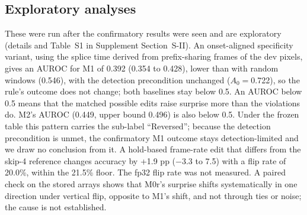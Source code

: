 \subsection{Exploratory analyses}
\label{sec:res-expl}
These were run after the confirmatory results were seen and are exploratory (details and Table~S1 in Supplement Section~S-II). An onset-aligned specificity variant, using the splice time derived from prefix-sharing frames of the dev pixels, gives an AUROC for M1 of 0.392 (0.354 to 0.428), lower than with random windows (0.546), with the detection precondition unchanged ($A_0=$0.722), so the rule's outcome does not change; both baselines stay below 0.5. An AUROC below 0.5 means that the matched possible edits raise surprise more than the violations do. M2's AUROC (0.449, upper bound 0.496) is also below 0.5. Under the frozen table this pattern carries the sub-label ``Reversed''; because the detection precondition is unmet, the confirmatory M1 outcome stays detection-limited and we draw no conclusion from it. A hold-based frame-rate edit that differs from the skip-4 reference changes accuracy by +1.9 pp ($-$3.3 to 7.5) with a flip rate of 20.0\%, within the 21.5\% floor. The fp32 flip rate was not measured. A paired check on the stored arrays shows that M0r's surprise shifts systematically in one direction under vertical flip, opposite to M1's shift, and not through ties or noise; the cause is not established.
